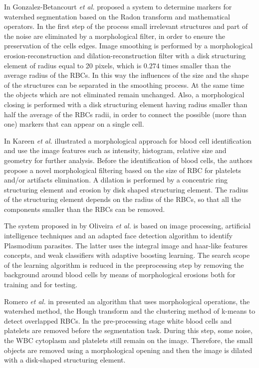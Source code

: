 \documentclass[sensors,review,submit,moreauthors,pdftex,10pt,a4paper]{mdpi}
\begin{document}
	In \cite{Gonzalez2016} Gonzalez-Betancourt \emph{et al.} proposed a system to determine markers for watershed segmentation based on the Radon transform and mathematical operators. In the first step of the process small irrelevant structures and part of the noise are eliminated by a morphological filter, in order to ensure the preservation of the cells edges. Image smoothing is performed by a morphological erosion-reconstruction and dilation-reconstruction filter with a disk structuring element of radius equal to 20 pixels, which is $0.274$ times smaller than the average radius of the RBCs. In this way the influences of the size and the shape of the structures can be separated in the smoothing process. At the same time the objects which are not eliminated remain unchanged. Also, a morphological closing is performed with a disk structuring element having radius smaller than half the average of the RBCs radii, in order to connect the possible (more than one) markers that can appear on a single cell.
	
	In \cite{Kareem2012} Kareen \emph{et al.} illustrated a morphological approach for blood cell identification and use the image features such as intensity, histogram, relative size and geometry for further analysis. Before the identification of blood cells, the authors  propose a novel morphological filtering based on the size of RBC for platelets and/or artifacts elimination. A dilation is performed by a concentric ring structuring element and erosion by disk shaped structuring element. The radius of the structuring element depends on the radius of the RBCs, so that all the components smaller than the RBCs can be removed.
	
	The system proposed in \cite{Oliveira2017} by Oliveira \emph{et al.} is based on image processing, artificial intelligence techniques and an adapted face detection algorithm to identify Plasmodium parasites. The latter uses the integral image and haar-like features concepts, and weak classifiers with adaptive boosting learning. The search scope of the learning algorithm is reduced in the preprocessing step by removing the background around blood cells by means of morphological erosions both for training and for testing.
	
	Romero \emph{et al.} in \cite{Romero2016} presented an algorithm that uses morphological operations, the watershed method, the Hough transform and the clustering method of k-means to detect overlapped RBCs. In the pre-processing stage white blood cells and platelets are removed before the segmentation task. During this step, some noise, the WBC cytoplasm and platelets still remain on the image. Therefore, the small objects are removed using a morphological opening and then the image is dilated with a disk-shaped structuring element.
	
\end{document}
